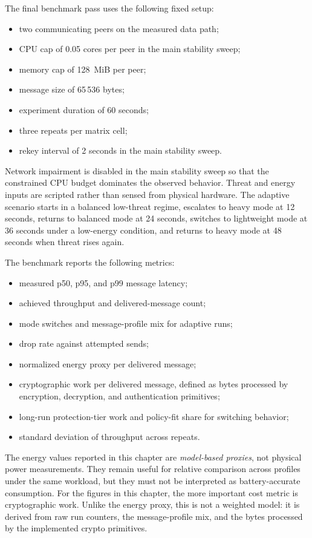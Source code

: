 The final benchmark pass uses the following fixed setup:
\begin{itemize}
    \item two communicating peers on the measured data path;
    \item CPU cap of 0.05 cores per peer in the main stability sweep;
    \item memory cap of 128~MiB per peer;
    \item message size of 65\,536 bytes;
    \item experiment duration of 60 seconds;
    \item three repeats per matrix cell;
    \item rekey interval of 2 seconds in the main stability sweep.
\end{itemize}

Network impairment is disabled in the main stability sweep so that the constrained CPU budget dominates the observed behavior. Threat and energy inputs are scripted rather than sensed from physical hardware. The adaptive scenario starts in a balanced low-threat regime, escalates to heavy mode at 12 seconds, returns to balanced mode at 24 seconds, switches to lightweight mode at 36 seconds under a low-energy condition, and returns to heavy mode at 48 seconds when threat rises again.

The benchmark reports the following metrics:
\begin{itemize}
    \item measured p50, p95, and p99 message latency;
    \item achieved throughput and delivered-message count;
    \item mode switches and message-profile mix for adaptive runs;
    \item drop rate against attempted sends;
    \item normalized energy proxy per delivered message;
    \item cryptographic work per delivered message, defined as bytes processed by encryption, decryption, and authentication primitives;
    \item long-run protection-tier work and policy-fit share for switching behavior;
    \item standard deviation of throughput across repeats.
\end{itemize}

The energy values reported in this chapter are \emph{model-based proxies}, not physical power measurements. They remain useful for relative comparison across profiles under the same workload, but they must not be interpreted as battery-accurate consumption.
For the figures in this chapter, the more important cost metric is cryptographic work. Unlike the energy proxy, this is not a weighted model: it is derived from raw run counters, the message-profile mix, and the bytes processed by the implemented crypto primitives.

